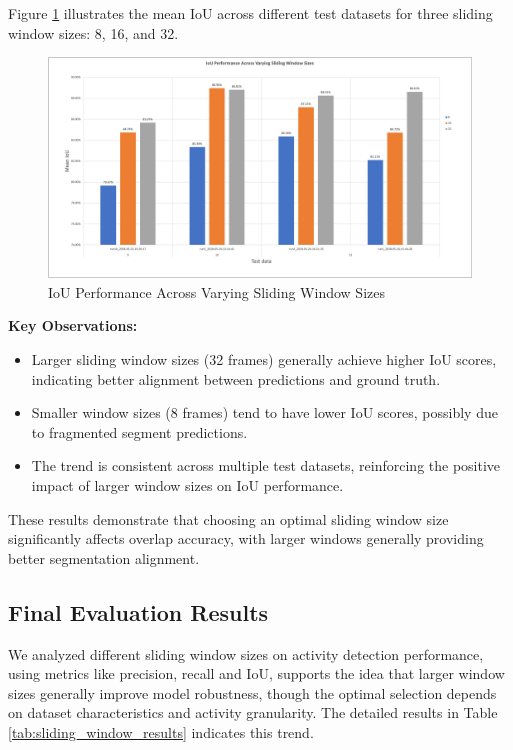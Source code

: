 \documentclass{article}
\begin{document}
Figure \ref{fig:iou-performance} illustrates the mean IoU across different test datasets for three sliding window sizes: 8, 16, and 32.

\begin{figure}[ht]
    \centering
    \includegraphics[width=0.8\linewidth]{figs/iou.png}
    \caption{IoU Performance Across Varying Sliding Window Sizes}
    \label{fig:iou-performance}
\end{figure}

\textbf{Key Observations:}
\begin{itemize}
    \item Larger sliding window sizes (32 frames) generally achieve higher IoU scores, indicating better alignment between predictions and ground truth.
    \item Smaller window sizes (8 frames) tend to have lower IoU scores, possibly due to fragmented segment predictions.
    \item The trend is consistent across multiple test datasets, reinforcing the positive impact of larger window sizes on IoU performance.
\end{itemize}

These results demonstrate that choosing an optimal sliding window size significantly affects overlap accuracy, with larger windows generally providing better segmentation alignment.

\subsection{Final Evaluation Results}
We analyzed different sliding window sizes on activity detection performance, using metrics like precision, recall and IoU, supports the idea that larger window sizes generally improve model robustness, though the optimal selection depends on dataset characteristics and activity granularity. The detailed results in Table \ref{tab:sliding_window_results} indicates this trend.
  
\end{document}
